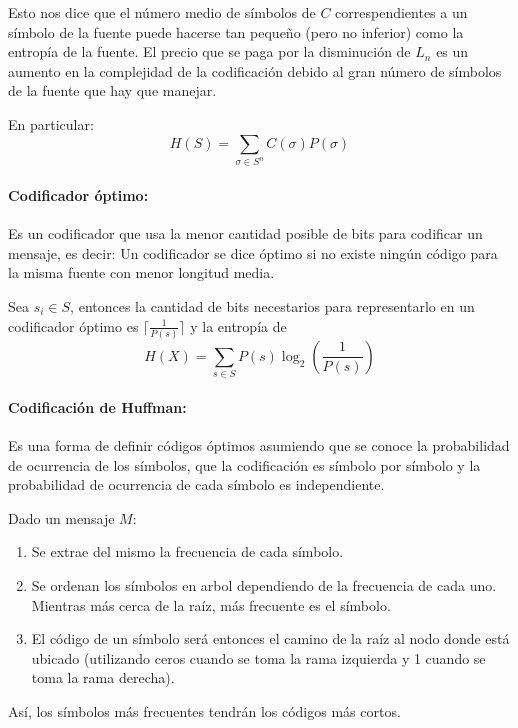 Esto nos dice que el número medio de símbolos de \(C\) correspendientes a un símbolo de la fuente puede hacerse tan pequeño (pero no inferior) como la entropía de la fuente. El precio que se paga por la disminución de \(L_n\) es un aumento en la complejidad de la codificación debido al gran número de símbolos de la fuente que hay que manejar.

En particular:
\[
  H(S) = \sum_{\sigma\in S^n} C(\sigma)P(\sigma)  
\]

\paragraph{Codificador óptimo:} Es un codificador que usa la menor cantidad posible de bits para codificar un mensaje, es decir: Un codificador se dice óptimo si no existe ningún código para la misma fuente con menor longitud media.

Sea \(s_i\in S\), entonces la cantidad de bits necestarios para representarlo en un codificador óptimo es \(\lceil\frac{1}{P(s)}\rceil\) y la entropía de \[H(X) = \sum_{s\in S} P(s)\log_2\left(\frac{1}{P(s)}\right)\]

\paragraph{Codificación de Huffman:} Es una forma de definir códigos óptimos asumiendo que se conoce la probabilidad de ocurrencia de los símbolos, que la codificación es símbolo por símbolo y la probabilidad de ocurrencia de cada símbolo es independiente.

Dado un mensaje \(M\):
\begin{enumerate}
  \item Se extrae del mismo la frecuencia de cada símbolo.
  \item Se ordenan los símbolos en arbol dependiendo de la frecuencia de cada uno. Mientras más cerca de la raíz, más frecuente es el símbolo.
  \item El código de un símbolo será entonces el camino de la raíz al nodo donde está ubicado (utilizando
  ceros cuando se toma la rama izquierda y 1 cuando se toma la rama derecha).
\end{enumerate} 

Así, los símbolos más frecuentes tendrán los códigos más cortos.



